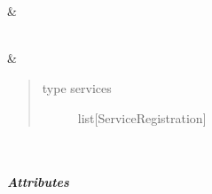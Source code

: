\documentclass[letterpaper,10pt,english]{sphinxmanual}
\begin{document}
\begin{savenotes}\sphinxatlongtablestart\begin{longtable}[c]{}
\hline

\endfirsthead

%
{}\\
\hline

\endhead

\hline
{}\\
\endfoot

\endlastfoot

\sphinxAtStartPar
{\hyperref[\detokenize{autoapi/pine/pipelines/app/listener/service_listener/index:pine.pipelines.app.listener.service_listener.ServiceRegistration}]{}}
&
\sphinxAtStartPar

\\
\hline
\sphinxAtStartPar
{\hyperref[\detokenize{autoapi/pine/pipelines/app/listener/service_listener/index:pine.pipelines.app.listener.service_listener.ServiceListener}]{}}
&
\sphinxAtStartPar
\begin{quote}\begin{description}
\item[{type services}] \leavevmode
\sphinxAtStartPar
list{[}ServiceRegistration{]}

\end{description}\end{quote}

\\
\hline
\end{longtable}\sphinxatlongtableend\end{savenotes}


\subparagraph{Attributes}
\label{\detokenize{autoapi/pine/pipelines/app/listener/service_listener/index:attributes}}
\end{document}
